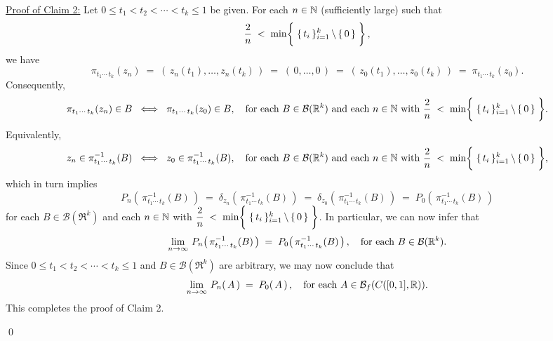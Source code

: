 \begin{enumerate}
	\vskip 0.5cm
	\noindent
	\underline{Proof of Claim 2:} \;
	Let $0 \leq t_{1} < t_{2} < \cdots < t_{k} \leq 1$ be given.
	For each $n \in \N$ (sufficiently large) such that
	\begin{equation*}
	\dfrac{2}{n} \;<\; \min\!\left\{\;\{\,t_{i}\,\}_{i=1}^{k}\,\backslash\,\{\,\overset{{\color{white}1}}{0}\,\}\;\right\},
	\end{equation*}
	we have
	\begin{equation*}
	\pi_{t_{1}\cdots\,t_{k}}(z_{n})
	\;=\; \left(\,z_{n}(t_{1}),\ldots,z_{n}(t_{k})\,\right)
	\;=\; \left(\,0,\ldots,0\,\right)
	\;=\; \left(\,z_{0}(t_{1}),\ldots,z_{0}(t_{k})\,\right)
	\;=\; \pi_{t_{1}\cdots\,t_{k}}(z_{0}).
	\end{equation*}
	Consequently,
	\begin{equation*}
	\pi_{t_{1}\cdots\,t_{k}}(z_{n}) \in B
	\;\;\Longleftrightarrow\;\;
	\pi_{t_{1}\cdots\,t_{k}}(z_{0}) \in B,
	\quad\textnormal{for each $B \in \mathcal{B}(\Re^{k})$ and each $n\in\N$ with
	$\dfrac{2}{n} \;<\; \min\!\left\{\;\{\,t_{i}\,\}_{i=1}^{k}\,\backslash\,\{\,\overset{{\color{white}1}}{0}\,\}\;\right\}$}.
	\end{equation*}
	Equivalently,
	\begin{equation*}
	z_{n} \in \pi_{t_{1}\cdots\,t_{k}}^{-1}(B)
	\;\;\Longleftrightarrow\;\;
	z_{0} \in \pi_{t_{1}\cdots\,t_{k}}^{-1}(B),
	\quad\textnormal{for each $B \in \mathcal{B}(\Re^{k})$ and each $n \in \N$ with
	$\dfrac{2}{n} \;<\; \min\!\left\{\;\{\,t_{i}\,\}_{i=1}^{k}\,\backslash\,\{\,\overset{{\color{white}1}}{0}\,\}\;\right\}$},
	\end{equation*}
	which in turn implies
	\begin{equation*}
	P_{n}\!\left(\, \pi_{t_{1}\cdots\,t_{k}}^{-1}(B)\,\right)
	\;=\; \delta_{z_{n}}\!\left(\,\pi_{t_{1}\cdots\,t_{k}}^{-1}(B)\,\right)
	\;=\; \delta_{z_{0}}\!\left(\,\pi_{t_{1}\cdots\,t_{k}}^{-1}(B)\,\right)
	\;=\; P_{0}\!\left(\, \pi_{t_{1}\cdots\,t_{k}}^{-1}(B)\,\right)
	\end{equation*}
	for each $B \in \mathcal{B}(\Re^{k})$ and each $n \in \N$ with
	$\dfrac{2}{n} \;<\; \min\!\left\{\;\{\,t_{i}\,\}_{i=1}^{k}\,\backslash\,\{\,\overset{{\color{white}1}}{0}\,\}\;\right\}$.
	In particular, we can now infer that
	\begin{equation*}
	\lim_{n\rightarrow\infty}\,P_{n}\!\left(\, \pi_{t_{1}\cdots\,t_{k}}^{-1}(B)\,\right)
	\;=\; P_{0}\!\left(\, \pi_{t_{1}\cdots\,t_{k}}^{-1}(B)\,\right),
	\quad\textnormal{for each $B \in \mathcal{B}(\Re^{k})$}.
	\end{equation*}
	Since $0 \leq t_{1} < t_{2} < \cdots < t_{k} \leq 1$ and $B \in \mathcal{B}(\Re^{k})$ are arbitrary,
	we may now conclude that
	\begin{equation*}
	\lim_{n\rightarrow\infty}\,P_{n}\!\left(\,A\,\right)
	\;=\; P_{0}\!\left(\,A\,\right),
	\quad\textnormal{for each $A \in \mathcal{B}_{f}(\Czo)$}.
	\end{equation*}
	This completes the proof of Claim 2.
\end{enumerate}
\qed


